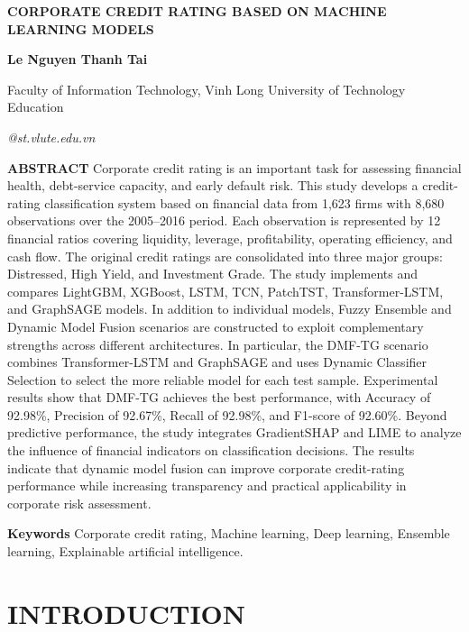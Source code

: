 \documentclass[10pt,twoside]{article}
\makeatletter
\newcommand{\arialfont}{\fontfamily{phv}\selectfont}
\newcommand{\fairsmallfont}{\fontsize{9pt}{11pt}\selectfont}
\newcommand{\fairsuperscript}[1]{%
  \raisebox{0.8ex}{\fontsize{8pt}{8pt}\selectfont #1}%
}
\newcommand{\PaperTitle}{CORPORATE CREDIT RATING BASED ON MACHINE LEARNING MODELS}
\newcommand{\PaperAuthors}{Le Nguyen Thanh Tai\fairsuperscript{1}}
\newcommand{\PaperAffiliations}{%
\fairsuperscript{1}Faculty of Information Technology, Vinh Long University of Technology Education
}
\newcommand{\PaperEmail}{22022001@st.vlute.edu.vn}
\newcommand{\makefairtitle}{%
\thispagestyle{firstpage}%
\begin{center}
{\arialfont\bfseries\fontsize{14pt}{16pt}\selectfont\MakeUppercase{\PaperTitle}\par}
\vspace{3pt}
{\bfseries\fontsize{12pt}{14pt}\selectfont\PaperAuthors\par}
\vspace{3pt}
{\fairsmallfont\PaperAffiliations\par}
\vspace{3pt}
{\itshape\fairsmallfont\PaperEmail\par}
\end{center}
\vspace{6pt}%
}
\newcommand{\FairDash}{\unskip\textemdash\space}
\newenvironment{fairabstract}{%
\begingroup
\fairsmallfont
\itshape
\setlength{\parindent}{1cm}%
\setlength{\parskip}{6pt}%
}{%
\par\endgroup
}
\newcommand{\fairabstracttext}[1]{%
\begin{fairabstract}
\textbf{ABSTRACT}\FairDash #1
\end{fairabstract}
}
\newcommand{\fairkeywords}[1]{%
\begin{fairabstract}
\textbf{Keywords}\FairDash #1
\end{fairabstract}
}
\makeatother
\begin{document}
\makefairtitle

\fairabstracttext{%
Corporate credit rating is an important task for assessing financial health, debt-service capacity, and early default risk.
This study develops a credit-rating classification system based on financial data from 1,623 firms with 8,680 observations over the 2005--2016 period. Each observation is represented by 12 financial ratios covering liquidity, leverage, profitability, operating efficiency, and cash flow. The original credit ratings are consolidated into three major groups: Distressed, High Yield, and Investment Grade. The study implements and compares LightGBM, XGBoost, LSTM, TCN, PatchTST, Transformer-LSTM, and GraphSAGE models. In addition to individual models, Fuzzy Ensemble and Dynamic Model Fusion scenarios are constructed to exploit complementary strengths across different architectures. In particular, the DMF-TG scenario combines Transformer-LSTM and GraphSAGE and uses Dynamic Classifier Selection to select the more reliable model for each test sample. Experimental results show that DMF-TG achieves the best performance, with Accuracy of 92.98\%, Precision of 92.67\%, Recall of 92.98\%, and F1-score of 92.60\%. Beyond predictive performance, the study integrates GradientSHAP and LIME to analyze the influence of financial indicators on classification decisions. The results indicate that dynamic model fusion can improve corporate credit-rating performance while increasing transparency and practical applicability in corporate risk assessment.
}

\fairkeywords{%
Corporate credit rating, Machine learning, Deep learning, Ensemble learning, Explainable artificial intelligence.
}

\section{INTRODUCTION}
\end{document}
